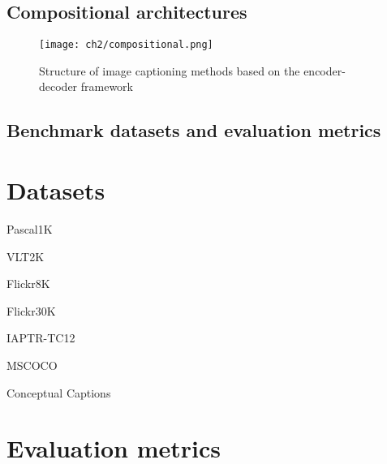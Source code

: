 \subsection{Compositional architectures}

\begin{figure}[hpt]
	\centering
	\texttt{[image: ch2/compositional.png]}
	\caption{Structure of image captioning methods based on the encoder-decoder framework}
	\label{fig:compositional}
\end{figure}

\subsection{Benchmark datasets and evaluation metrics}

\section{Datasets}

Pascal1K \citet{Rashtchian2010}

VLT2K \cite{Elliott2013}

Flickr8K \citet{Hodosh2015}

Flickr30K \cite{Young2014}

IAPTR-TC12 \cite{Grubinger2006}

MSCOCO \citet{Lin2014}

Conceptual Captions \cite{Sharma2018}

\section{Evaluation metrics}